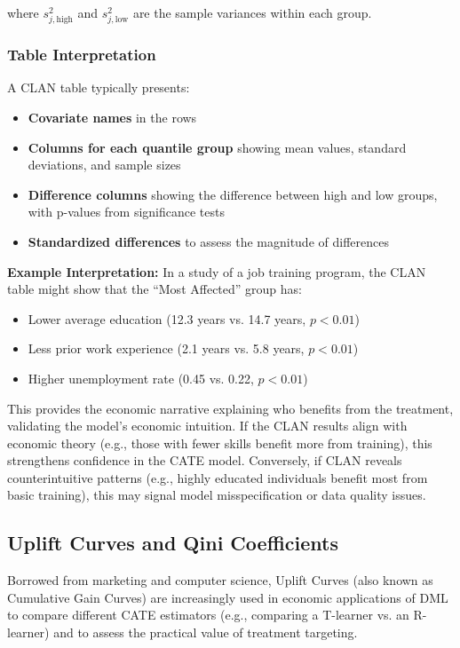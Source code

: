 \documentclass[12pt,a4paper]{article}
\begin{document}
where $s^2_{j,\text{high}}$ and $s^2_{j,\text{low}}$ are the sample variances within each group.

\subsubsection{Table Interpretation}

A CLAN table typically presents:

\begin{itemize}
\item \textbf{Covariate names} in the rows
\item \textbf{Columns for each quantile group} showing mean values, standard deviations, and sample sizes
\item \textbf{Difference columns} showing the difference between high and low groups, with p-values from significance tests
\item \textbf{Standardized differences} to assess the magnitude of differences
\end{itemize}

\textbf{Example Interpretation:} In a study of a job training program, the CLAN table might show that the ``Most Affected'' group has:
\begin{itemize}
\item Lower average education (12.3 years vs. 14.7 years, $p < 0.01$)
\item Less prior work experience (2.1 years vs. 5.8 years, $p < 0.01$)
\item Higher unemployment rate (0.45 vs. 0.22, $p < 0.01$)
\end{itemize}

This provides the economic narrative explaining who benefits from the treatment, validating the model's economic intuition. If the CLAN results align with economic theory (e.g., those with fewer skills benefit more from training), this strengthens confidence in the CATE model. Conversely, if CLAN reveals counterintuitive patterns (e.g., highly educated individuals benefit most from basic training), this may signal model misspecification or data quality issues.

\subsection{Uplift Curves and Qini Coefficients}

Borrowed from marketing and computer science, Uplift Curves (also known as Cumulative Gain Curves) are increasingly used in economic applications of DML to compare different CATE estimators (e.g., comparing a T-learner vs. an R-learner) and to assess the practical value of treatment targeting.
\end{document}
